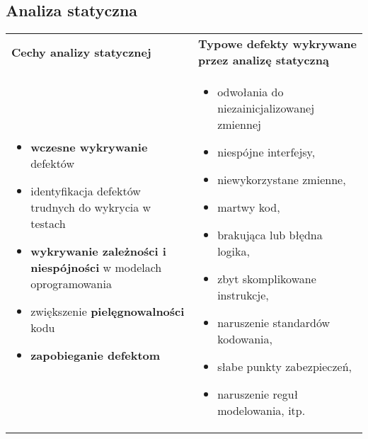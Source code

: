 \documentclass[../main.tex]{subfiles}
\begin{document}
    \subsection{Analiza statyczna}

    \begin{table}[H]
        \begin{center}
            \begin{tabular}{p{8cm} p{8cm}}
                \textbf{Cechy analizy statycznej} & \textbf{Typowe defekty wykrywane przez analizę statyczną}\\
                \begin{itemize}
                    \item \textbf{wczesne wykrywanie} defektów
                    \item identyfikacja defektów trudnych do wykrycia w testach
                    \item \textbf{wykrywanie zależności i niespójności} w modelach oprogramowania
                    \item zwiększenie \textbf{pielęgnowalności} kodu
                    \item \textbf{zapobieganie defektom}
                \end{itemize}
                &
                \begin{itemize}
                    \item odwołania do niezainicjalizowanej zmiennej
                    \item niespójne interfejsy,
                    \item niewykorzystane zmienne,
                    \item martwy kod,
                    \item brakująca lub błędna logika,
                    \item zbyt skomplikowane instrukcje,
                    \item naruszenie standardów kodowania,
                    \item słabe punkty zabezpieczeń,
                    \item naruszenie reguł modelowania, itp.
                \end{itemize}\\
            \end{tabular}
        \end{center}
    \end{table}
\end{document}
